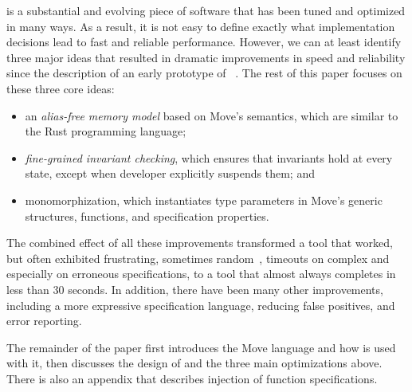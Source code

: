 \MVP is a substantial and evolving piece of software that has been tuned and
optimized in many ways.  As a result, it is not easy to define exactly what
implementation decisions lead to fast and reliable performance.  However, we can
at least identify three major ideas that resulted in dramatic improvements in
speed and reliability since the description of an early prototype of
\MVP~\cite{MOVE_PROVER}.  The rest of this paper focuses on these three core
ideas:
\begin{itemize}
\item an \emph{alias-free memory model} based on Move's semantics, which are
  similar to the Rust programming language;
\item \emph{fine-grained invariant checking}, which ensures that invariants hold
  at every state, except when developer explicitly suspends them; and
\item monomorphization, which instantiates type parameters in Move's generic
  structures, functions, and specification properties.
\end{itemize}
The combined effect of all these improvements transformed a tool that worked,
but often exhibited frustrating, sometimes random~\cite{BUTTERFLY}, timeouts on
complex and especially on erroneous specifications, to a tool that almost always
completes in less than 30 seconds.  In addition, there have been many other
improvements, including a more expressive specification language, reducing false
positives, and error reporting.

The remainder of the paper first introduces the Move language and how \MVP is
used with it, then discusses the design of \MVP and the three main optimizations
above.  There is also an appendix that describes injection of function
specifications.


